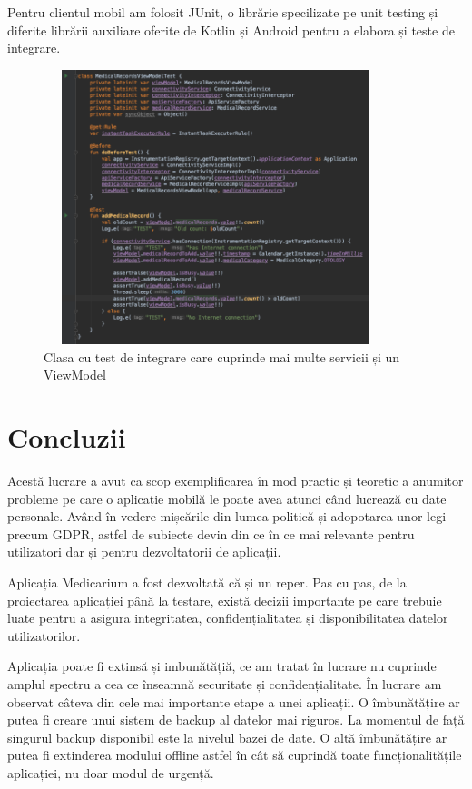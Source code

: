 \documentclass[12pt]{article}
\begin{document}
Pentru clientul mobil am folosit JUnit, o librărie specilizate pe unit testing și
diferite librării auxiliare oferite de Kotlin și Android pentru a elabora și teste de integrare.

\begin{figure}[H]
    \centering
    \includegraphics[width=10cm, height=8cm]{interg.png}
    \caption{Clasa cu test de integrare care cuprinde mai multe servicii și un ViewModel}
    \end{figure}


\newpage
\section{Concluzii}

Acestă lucrare a avut ca scop exemplificarea în mod practic și teoretic a anumitor probleme
pe care o aplicație mobilă le poate avea atunci când lucrează cu date personale.
Având în vedere mișcările din lumea politică și adopotarea unor legi precum GDPR, 
astfel de subiecte devin din ce în ce mai relevante pentru utilizatori dar și pentru
dezvoltatorii de aplicații. 

\bigskip

Aplicația Medicarium a fost dezvoltată că și un reper. Pas cu pas, de la proiectarea
aplicației până la testare, există decizii importante pe care trebuie luate pentru a asigura
integritatea, confidențialitatea și disponibilitatea datelor utilizatorilor.

\bigskip
Aplicația poate fi extinsă și imbunătățiă, ce am tratat în lucrare nu cuprinde
amplul spectru a cea ce înseamnă securitate și confidențialitate. În lucrare am
observat câteva din cele mai importante etape a unei aplicații. O îmbunătățire
ar putea fi creare unui sistem de backup al datelor mai riguros. La momentul de față
singurul backup disponibil este la nivelul bazei de date. O altă îmbunătățire
ar putea fi extinderea modului offline astfel în cât să cuprindă toate funcționalitățile
aplicației, nu doar modul de urgență.
\end{document}

